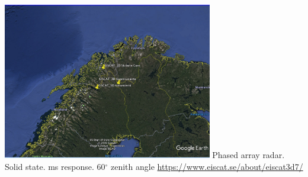 \begin{frame}[fragile,t]
\frametitle{\hfill}
\vspace{0.1in}
\begin{center}
\includegraphics[height=2.7in]{EISCAT_3D_locations.jpg}
\vfill
    {\colblack Phased array radar. Solid state. ms response. 60$^\circ$ zenith angle}
    {\small \url{https://www.eiscat.se/about/eiscat3d7/}}
\end{center}
\end{frame}
